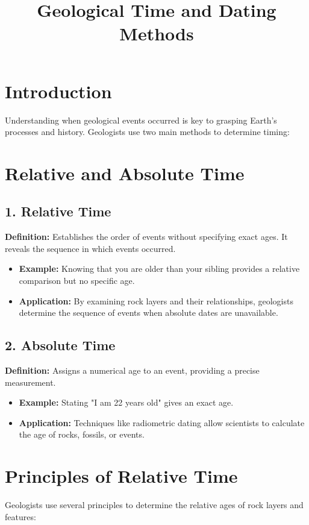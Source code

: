 \documentclass[12pt]{article}
\title{Geological Time and Dating Methods}
\author{}
\date{}
\begin{document}
\maketitle

\section*{Introduction}
Understanding when geological events occurred is key to grasping Earth's processes and history. Geologists use two main methods to determine timing:

\section*{Relative and Absolute Time}
\subsection*{1. Relative Time}
\textbf{Definition:} Establishes the order of events without specifying exact ages. It reveals the sequence in which events occurred.

\begin{itemize}
    \item \textbf{Example:} Knowing that you are older than your sibling provides a relative comparison but no specific age.
    \item \textbf{Application:} By examining rock layers and their relationships, geologists determine the sequence of events when absolute dates are unavailable.
\end{itemize}

\subsection*{2. Absolute Time}
\textbf{Definition:} Assigns a numerical age to an event, providing a precise measurement.

\begin{itemize}
    \item \textbf{Example:} Stating "I am 22 years old" gives an exact age.
    \item \textbf{Application:} Techniques like radiometric dating allow scientists to calculate the age of rocks, fossils, or events.
\end{itemize}

\section*{Principles of Relative Time}
Geologists use several principles to determine the relative ages of rock layers and features:
\end{document}
